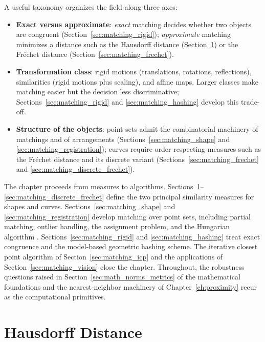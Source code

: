 A useful taxonomy organizes the field along three axes:
\begin{itemize}
  \item \textbf{Exact versus approximate}: \emph{exact} matching decides
    whether two objects are congruent (Section~\ref{sec:matching_rigid});
    \emph{approximate} matching minimizes a distance such as the Hausdorff
    distance (Section~\ref{sec:matching_hausdorff}) or the Fr\'echet distance
    (Section~\ref{sec:matching_frechet}).
  \item \textbf{Transformation class}: rigid motions (translations,
    rotations, reflections), similarities (rigid motions plus scaling), and
    affine maps. Larger classes make matching easier but the decision less
    discriminative; Sections~\ref{sec:matching_rigid} and
    \ref{sec:matching_hashing} develop this trade-off.
  \item \textbf{Structure of the objects}: point sets admit the
    combinatorial machinery of matchings and of arrangements
    (Sections~\ref{sec:matching_shape} and \ref{sec:matching_registration});
    curves require order-respecting measures such as the Fr\'echet distance
    and its discrete variant (Sections~\ref{sec:matching_frechet} and
    \ref{sec:matching_discrete_frechet}).
\end{itemize}

The chapter proceeds from measures to algorithms.
Sections~\ref{sec:matching_hausdorff}--\ref{sec:matching_discrete_frechet}
define the two principal similarity measures for shapes and curves.
Sections~\ref{sec:matching_shape} and \ref{sec:matching_registration} develop
matching over point sets, including partial matching, outlier handling, the
assignment problem, and the Hungarian algorithm
\cite{kuhn1955,cormen2009}. Sections~\ref{sec:matching_rigid} and
\ref{sec:matching_hashing} treat exact congruence and the model-based
geometric hashing scheme. The iterative closest point algorithm of
Section~\ref{sec:matching_icp} and the applications of
Section~\ref{sec:matching_vision} close the chapter. Throughout, the
robustness questions raised in Section~\ref{sec:math_norms_metrics} of the
mathematical foundations and the nearest-neighbor machinery of
Chapter~\ref{ch:proximity} recur as the computational primitives.


\section{Hausdorff Distance}
\label{sec:matching_hausdorff}


